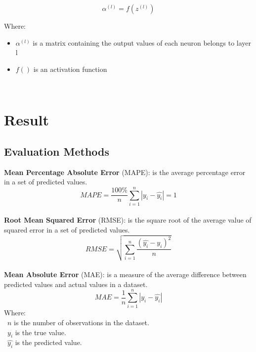 \documentclass{ieeeojies}
\begin{document}
\[ \alpha^{(l)} = f(z^{(l)}) \]

Where:\\
    \begin{itemize}
        \item $\alpha^{(l)}$ is a matrix containing the output values of each neuron belongs to layer l
        \item  $f()$ is an activation function
    \end{itemize}\\
    
\section{Result}
\subsection{Evaluation Methods}
\textbf{Mean Percentage Absolute Error} (MAPE): is the average percentage error in a set of predicted values.\\
\[MAPE=\frac{100\%}{n}  \sum_{i=1}^{n} |y_i-\hat{y_i} |  = 1 \]\\
\textbf{Root Mean Squared Error} (RMSE): is the square root of the average value of squared error in a set of predicted values.\\
\[RMSE=\sqrt{\sum_{i=1}^{n} \frac{(\hat{y_i}-y_i )^2}{n} }\]\\
\textbf{Mean Absolute Error} (MAE): is a measure of the average difference between predicted values and actual values in a dataset.\\
\[MAE = \frac{1}{n} \sum_{i=1}^{n} |y_i - \hat{y_i}| \]
Where: \\
	\indent\textbullet\ \(n\) is the number of observations in the dataset.\\
	\indent\textbullet\ \(y_i\)  is the true value.\\
	\indent\textbullet\ \(\hat{y_i}\) is the predicted value.
\end{document}
